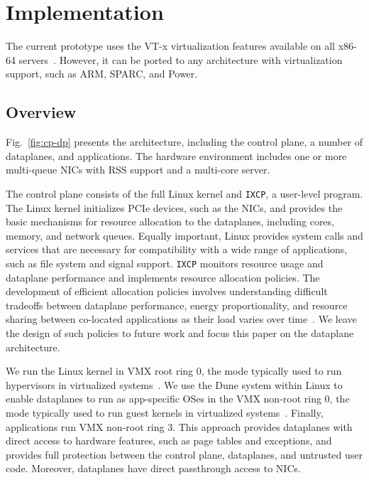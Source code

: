 
\section{\ix Implementation}
\label{sec:impl}




The current \ix prototype uses the VT-x virtualization features
available on all x86-64
servers~\cite{DBLP:journals/computer/UhligNRSMABKLS05}. However, it
can be ported to any architecture with virtualization support, such as
ARM, SPARC, and Power.

\subsection{Overview}
\label{sec:impl:overview}

Fig.~\ref{fig:cp-dp} presents the \ix architecture, including the
control plane, a number of dataplanes, and applications. The hardware
environment includes one or more multi-queue NICs with RSS support and
a multi-core server.

The \ix control plane consists of the full Linux kernel and
\texttt{IXCP}, a user-level program. The Linux kernel initializes PCIe
devices, such as the NICs, and provides the basic mechanisms for
resource allocation to the dataplanes, including cores, memory, and
network queues. Equally important, Linux provides system calls and
services that are necessary for compatibility with a wide range of
applications, such as file system and signal support. \texttt{IXCP}
monitors resource usage and dataplane performance and implements
resource allocation policies. The development of efficient allocation
policies involves understanding difficult tradeoffs between dataplane
performance, energy proportionality, and resource sharing between
co-located applications as their load varies over
time~\cite{DBLP:conf/eurosys/LeverichK14}. We leave the design of
such policies to future work and focus this paper on the \ix dataplane
architecture.

We run the Linux kernel in VMX root ring 0, the mode typically used to
run hypervisors in virtualized
systems~\cite{DBLP:journals/computer/UhligNRSMABKLS05}. We use the
Dune system within Linux to enable dataplanes to run as app-specific
OSes in the VMX non-root ring 0, the mode typically used to run guest
kernels in virtualized systems~\cite{dune}.
Finally, applications run VMX non-root ring 3. This approach provides
dataplanes with direct access to hardware features, such as page
tables and exceptions, and provides full protection between the
control plane, dataplanes, and untrusted user code. Moreover,
dataplanes have direct passthrough access to  NICs.


